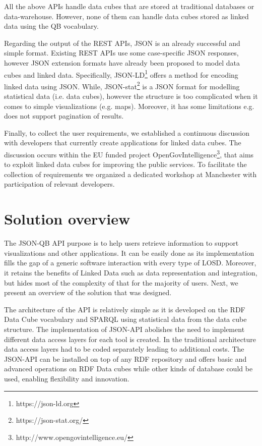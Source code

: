 \documentclass{llncs}
\begin{document}
All the above APIs handle data cubes that are stored at traditional databases or data-warehouse. However, none of them can handle data cubes  stored as linked data using the QB vocabulary.  

Regarding the output of the REST APIs, JSON is an already successful and simple format. Existing REST APIs use some case-specific JSON responses, however JSON extension formats have already been proposed to model data cubes and linked data. Specifically, JSON-LD\footnote{https://json-ld.org} offers a method for encoding linked data using JSON. While, JSON-stat\footnote{https://json-stat.org/} is a JSON format for modelling statistical data (i.e. data cubes), however the structure is too complicated when it comes to simple visualizations (e.g. maps). Moreover, it has some limitations e.g. does not support pagination of results. 

Finally, to collect the user requirements, we established a continuous discussion with developers that currently create applications for linked data cubes. The discussion occurs within the EU funded project OpenGovIntelligence\footnote{http://www.opengovintelligence.eu/}, that aims to exploit linked data cubes for improving the public services. To facilitate the collection of requirements we organized a dedicated workshop at Manchester with participation of relevant developers. 


\section{Solution overview}\label{sec:overview}


The JSON-QB API purpose is to help users retrieve information to support visualizations and other applications. It can be easily done as its implementation fills the gap of a generic software interaction with every type of LOSD. Moreover, it retains the benefits of Linked Data such as data representation and integration, but hides most of the complexity of that for the majority of users. Next, we present an overview of the solution that was designed.

The architecture of the API is relatively simple as it is developed on the RDF Data Cube vocabulary and SPARQL using statistical data from the data cube structure. The implementation of JSON-API abolishes the need to implement different data access layers for each tool is created. In the traditional architecture data access layers had to be coded separately leading to additional costs. The JSON-API can be installed on top of any RDF repository and offers basic and advanced operations on RDF Data cubes while other kinds of database could be used, enabling flexibility and innovation.
\end{document}
